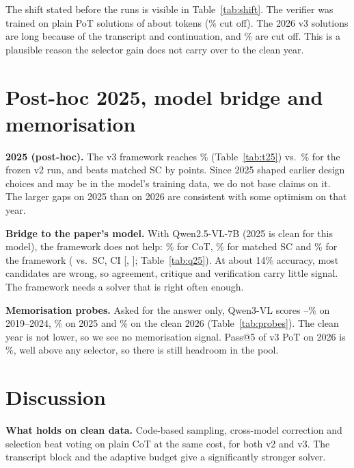 \documentclass[conference]{IEEEtran}
\begin{document}
The shift stated before the runs is visible in Table~\ref{tab:shift}. The verifier was trained on
plain PoT solutions of about \TokTrain{} tokens (\TruncTrain\% cut off). The 2026 v3 solutions are
\TokTest{} long because of the transcript and continuation, and \TruncTest\% are cut off. This is a
plausible reason the selector gain does not carry over to the clean year.



\section{Post-hoc 2025, model bridge and memorisation}

\textbf{2025 (post-hoc).} The v3 framework reaches \PostAcc\% (Table~\ref{tab:t25}) vs.\
\PostTwoAcc\% for the frozen v2 run, and beats matched SC by \PostVsSc{} points. Since 2025 shaped
earlier design choices and may be in the model's training data, we do not base claims on it. The
larger gaps on 2025 than on 2026 are consistent with some optimism on that year.


\textbf{Bridge to the paper's model.} With Qwen2.5-VL-7B (2025 is clean for this model), the
framework does not help: \QBase\% for CoT, \QSc\% for matched SC and \QFull\% for the framework
(\QVsSc{} vs.\ SC, CI [\QVsScLo, \QVsScHi]; Table~\ref{tab:q25}). At about 14\% accuracy, most
candidates are wrong, so agreement, critique and verification carry little signal. The framework
needs a solver that is right often enough.


\textbf{Memorisation probes.} Asked for the answer only, Qwen3-VL scores \ProbeOldLo--\ProbeOldHi\%
on 2019--2024, \ProbeTwentyFive\% on 2025 and \ProbeTwentySix\% on the clean 2026
(Table~\ref{tab:probes}). The clean year is not lower, so we see no memorisation signal. Pass@5 of
v3 PoT on 2026 is \PassFiveThree\%, well above any selector, so there is
still headroom in the pool.

\section{Discussion}
\textbf{What holds on clean data.} Code-based sampling, cross-model correction and selection beat
voting on plain CoT at the same cost, for both v2 and v3. The transcript block and the adaptive
budget give a significantly stronger solver.
\end{document}
